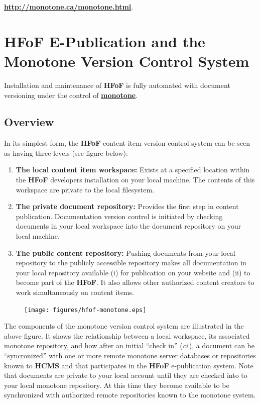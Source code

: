 \documentclass[12pt]{article}
\begin{document}
\href{http://monotone.ca/monotone.html}{\bf http://monotone.ca/monotone.html}.

\section{HFoF E-Publication and the Monotone Version Control System}

Installation and maintenance of {\bf \small HFoF} is fully automated with document versioning under the control of \href{http://monotone.ca/}{\bf monotone}. 

\subsection{Overview}
In its simplest form,  the {\bf \small HFoF} content item version control system can be seen as having three levels (see figure below):
\begin{enumerate}
\item {\bf The local content item workspace:} Exists at a specified location within the {\bf \small HFoF} developers installation on your local machine. The contents of this workspace are private to the local filesystem.
\item {\bf The private document repository:} Provides the first step in content publication. Documentation version control is initiated by checking documents in your local workspace into the document repository on your local machine.
\item {\bf The public content repository:} Pushing documents from your local repository to the publicly accessible repository makes all documentation in your local repository available (i) for publication on your website and (ii) to become part of the {\bf \small HFoF}. It also allows other authorized content creators to work simultaneously on content items.
\end{enumerate}

\begin{figure}[h]
  \centering
 \texttt{[image: figures/hfof-monotone.eps]}
  \label{fig:monotone}
\end{figure}

The components of the monotone version control system are illustrated in the above figure. It shows the relationship between a local workspace, its associated monotone repository, and how after an initial ``check in'' ({\it ci}\,), a document can be ``syncronized'' with one or more remote monotone server databases or repositories known to {\bf \small HCMS} and that participates in the {\bf \small HFoF} e-publication system. Note that documents are private to your local account until they are checked into to your local monotone repository. At this time they become available to be synchronized with authorized remote repositories known to the monotone system.
\end{document}
